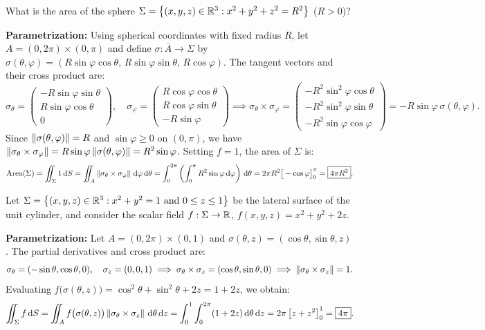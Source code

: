 \begin{exemple}
What is the area of the sphere $\Sigma = \left\{(x,y,z) \in \mathbb{R}^3 : x^2 + y^2 + z^2 = R^2\right\}$ ($R > 0$)?

\smallskip
\noindent\textbf{Parametrization:} Using spherical coordinates with fixed radius $R$, let $A = (0, 2\pi) \times (0, \pi)$ and define $\sigma : \overline{A} \to \Sigma$ by $\sigma(\theta, \varphi) = (R \sin\varphi \cos\theta, \, R \sin\varphi \sin\theta, \, R \cos\varphi)$. The tangent vectors and their cross product are:
\[
    \sigma_\theta = \begin{pmatrix} -R \sin\varphi \sin\theta \\ R \sin\varphi \cos\theta \\ 0 \end{pmatrix}, \quad
    \sigma_\varphi = \begin{pmatrix} R \cos\varphi \cos\theta \\ R \cos\varphi \sin\theta \\ -R \sin\varphi \end{pmatrix}
    \implies
    \sigma_\theta \times \sigma_\varphi = \begin{pmatrix} -R^2 \sin^2\varphi \cos\theta \\ -R^2 \sin^2\varphi \sin\theta \\ -R^2 \sin\varphi \cos\varphi \end{pmatrix} = -R \sin\varphi \, \sigma(\theta, \varphi).
\]
Since $\left\lVert\sigma(\theta, \varphi)\right\rVert = R$ and $\sin\varphi \ge 0$ on $(0, \pi)$, we have $\left\lVert\sigma_\theta \times \sigma_\varphi\right\rVert = R \sin\varphi \left\lVert\sigma(\theta, \varphi)\right\rVert = R^2 \sin\varphi$. Setting $f = 1$, the area of $\Sigma$ is:
\[
    \operatorname{Area}(\Sigma) = \iint_{\Sigma} 1 \,\mathrm{d}S = \iint_{A} \left\lVert\sigma_\theta \times \sigma_\varphi\right\rVert \,\mathrm{d}\varphi \,\mathrm{d}\theta = \int_{0}^{2\pi} \left( \int_{0}^{\pi} R^2 \sin\varphi \,\mathrm{d}\varphi \right) \,\mathrm{d}\theta = 2\pi R^2 \big[ -\cos\varphi \big]_{0}^{\pi} = \boxed{4\pi R^2}.
\]
\end{exemple}

\begin{exemple}
Let $\Sigma = \left\{(x,y,z) \in \mathbb{R}^3 : x^2 + y^2 = 1 \text{ and } 0 \le z \le 1\right\}$ be the lateral surface of the unit cylinder, and consider the scalar field $f : \Sigma \to \mathbb{R}$, $f(x,y,z) = x^2 + y^2 + 2z$.

\smallskip
\noindent\textbf{Parametrization:} Let $A = (0, 2\pi) \times (0, 1)$ and $\sigma(\theta, z) = (\cos\theta, \sin\theta, z)$. The partial derivatives and cross product are:
\[
    \sigma_\theta = (-\sin\theta, \cos\theta, 0), \quad \sigma_z = (0, 0, 1) \implies \sigma_\theta \times \sigma_z = (\cos\theta, \sin\theta, 0) \implies \left\lVert\sigma_\theta \times \sigma_z\right\rVert = 1.
\]
Evaluating $f\big(\sigma(\theta, z)\big) = \cos^2\theta + \sin^2\theta + 2z = 1 + 2z$, we obtain:
\[
    \iint_{\Sigma} f \,\mathrm{d}S = \iint_{A} f\big(\sigma(\theta, z)\big) \left\lVert\sigma_\theta \times \sigma_z\right\rVert \,\mathrm{d}\theta \,\mathrm{d}z = \int_{0}^{1} \int_{0}^{2\pi} (1 + 2z) \,\mathrm{d}\theta \,\mathrm{d}z = 2\pi \left[ z + z^2 \right]_{0}^{1} = \boxed{4\pi}.
\]
\end{exemple}

